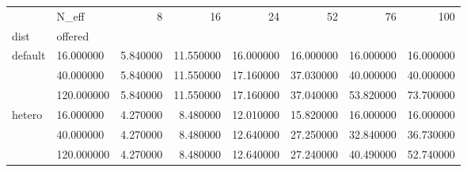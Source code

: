 \begin{tabular}{llrrrrrr}
\toprule
 & N_eff & 8 & 16 & 24 & 52 & 76 & 100 \\
dist & offered &  &  &  &  &  &  \\
\midrule
\multirow[t]{3}{*}{default} & 16.000000 & 5.840000 & 11.550000 & 16.000000 & 16.000000 & 16.000000 & 16.000000 \\
 & 40.000000 & 5.840000 & 11.550000 & 17.160000 & 37.030000 & 40.000000 & 40.000000 \\
 & 120.000000 & 5.840000 & 11.550000 & 17.160000 & 37.040000 & 53.820000 & 73.700000 \\
\cline{1-8}
\multirow[t]{3}{*}{hetero} & 16.000000 & 4.270000 & 8.480000 & 12.010000 & 15.820000 & 16.000000 & 16.000000 \\
 & 40.000000 & 4.270000 & 8.480000 & 12.640000 & 27.250000 & 32.840000 & 36.730000 \\
 & 120.000000 & 4.270000 & 8.480000 & 12.640000 & 27.240000 & 40.490000 & 52.740000 \\
\cline{1-8}
\bottomrule
\end{tabular}
